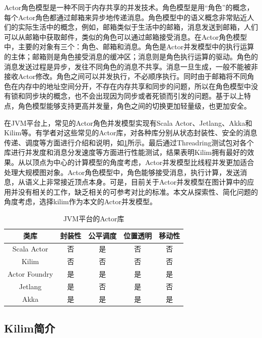 Actor角色模型是一种不同于内存共享的并发技术。角色模型是用“角色”的概念，每个Actor角色都通过邮箱来异步地传递消息。角色模型中的语义概念非常贴近人们的实际生活中的概念，例如，邮箱类似于生活中的邮箱，消息发送到邮箱，人们可以从邮箱中获取邮件，类似的角色可以通过邮箱接受消息。在Actor角色模型中，主要的对象有三个：角色、邮箱和消息。角色是Actor并发模型中的执行运算的主体；邮箱则是角色接受消息的缓冲区；消息则是角色执行运算的驱动。角色的消息发送过程是异步，发往不同角色的消息不共享。消息一旦生成，一般不能被非接收Actor修改。角色之间可以并发执行，不必顺序执行。同时由于邮箱将不同角色在内存中的地址空间分开，不存在内存共享和同步的问题，所以在角色模型中没有锁和同步块的概念，也不会出现因为同步或者死锁而引发的问题。基于以上特点，角色模型能够支持更高并发量，角色之间的切换更加轻量级，也更加安全。

在JVM平台上，常见的Actor角色并发模型实现有Scala Actor、Jetlang、Akka和Kilim等。有学者\cite{karmani2009actor}对这些常见的Actor库，对各种库分别从状态封装性、安全的消息传递、调度等方面进行介绍和说明，如\ref{table:actors}所示。最后通过Threadring测试包对各个库进行并发度和消息分发速度等方面进行性能测试，结果表明Kilim拥有最好的效果。从以顶点为中心的计算模型的角度考虑，Actor并发模型比线程并发更加适合处理大规模图对象。Actor角色模型中，角色能够接受消息，执行计算，发送消息，从语义上非常接近顶点本身。可是，目前关于Actor并发模型在图计算中的应用并没有相关的工作，缺乏相关的可参考对比的标准。本文从探索性、简化问题的角度考虑，选择kilim作为本文的Actor并发模型。

\begin{table}[htbp]
\caption{JVM平台的Actor库}\label{table:actors}
\vspace{0.5em}\centering\wuhao
\begin{tabular}{ccccc}
\toprule[1.5pt]
类库 & 封装性   & 公平调度   & 位置透明 & 移动性  \\
\midrule[1pt]
Scala Actor & 否 &是& 否 & 否\\
Kilim & 否 & 否 & 否 & 否\\
Actor Foundry & 是 & 是& 是 & 是\\
Jetlang & 是 & 否 & 是 &  否 \\
Akka &  是 & 是& 是 & 是\\
\bottomrule[1.5pt]
\end{tabular}
\vspace{\baselineskip}
\end{table}

\subsection{Kilim简介}

